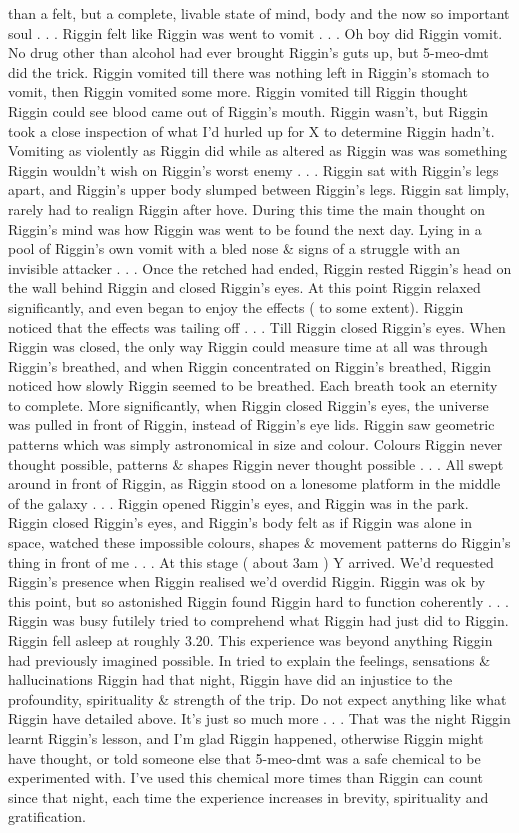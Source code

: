 \documentclass[12pt]{book}
\begin{document}
than a felt, but a complete, livable state of mind, body and the now so important soul . . .  Riggin felt like Riggin was went to vomit . . .  Oh boy did Riggin vomit. No drug other than alcohol had ever brought Riggin's guts up, but 5-meo-dmt did the trick. Riggin vomited till there was nothing left in Riggin's stomach to vomit, then Riggin vomited some more. Riggin vomited till Riggin thought Riggin could see blood came out of Riggin's mouth. Riggin wasn't, but Riggin took a close inspection of what I'd hurled up for X to determine Riggin hadn't. Vomiting as violently as Riggin did while as altered as Riggin was was something Riggin wouldn't wish on Riggin's worst enemy . . .  Riggin sat with Riggin's legs apart, and Riggin's upper body slumped between Riggin's legs. Riggin sat limply, rarely had to realign Riggin after hove. During this time the main thought on Riggin's mind was how Riggin was went to be found the next day. Lying in a pool of Riggin's own vomit with a bled nose \& signs of a struggle with an invisible attacker . . .  Once the retched had ended, Riggin rested Riggin's head on the wall behind Riggin and closed Riggin's eyes. At this point Riggin relaxed significantly, and even began to enjoy the effects ( to some extent). Riggin noticed that the effects was tailing off . . .  Till Riggin closed Riggin's eyes. When Riggin was closed, the only way Riggin could measure time at all was through Riggin's breathed, and when Riggin concentrated on Riggin's breathed, Riggin noticed how slowly Riggin seemed to be breathed. Each breath took an eternity to complete. More significantly, when Riggin closed Riggin's eyes, the universe was pulled in front of Riggin, instead of Riggin's eye lids. Riggin saw geometric patterns which was simply astronomical in size and colour. Colours Riggin never thought possible, patterns \& shapes Riggin never thought possible . . .  All swept around in front of Riggin, as Riggin stood on a lonesome platform in the middle of the galaxy . . .  Riggin opened Riggin's eyes, and Riggin was in the park. Riggin closed Riggin's eyes, and Riggin's body felt as if Riggin was alone in space, watched these impossible colours, shapes \& movement patterns do Riggin's thing in front of me . . .  At this stage ( about 3am ) Y arrived. We'd requested Riggin's presence when Riggin realised we'd overdid Riggin. Riggin was ok by this point, but so astonished Riggin found Riggin hard to function coherently . . .  Riggin was busy futilely tried to comprehend what Riggin had just did to Riggin. Riggin fell asleep at roughly 3.20. This experience was beyond anything Riggin had previously imagined possible. In tried to explain the feelings, sensations \& hallucinations Riggin had that night, Riggin have did an injustice to the profoundity, spirituality \& strength of the trip. Do not expect anything like what Riggin have detailed above. It's just so much more . . .  That was the night Riggin learnt Riggin's lesson, and I'm glad Riggin happened, otherwise Riggin might have thought, or told someone else that 5-meo-dmt was a safe chemical to be experimented with. I've used this chemical more times than Riggin can count since that night, each time the experience increases in brevity, spirituality and gratification.
\end{document}
